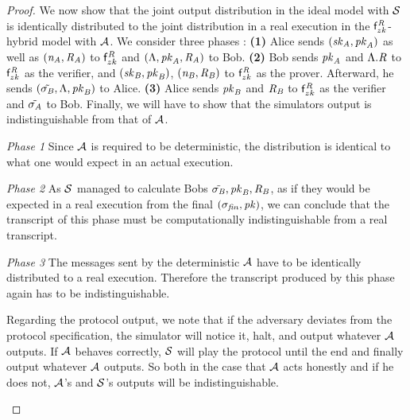\begin{proof}
    We now show that the joint output distribution in the ideal model with $\mathcal{S}$ is identically distributed to the joint distribution in a real execution in the $\mathsf{f}^{\mathit{R}}_{zk}$-hybrid model with $\mathcal{A}$.
    We consider three phases :
    \textbf{(1)} Alice sends $(\mathit{sk}_{\mathit{A}}, \mathit{pk}_{\mathit{A}})$ as well as $(\mathit{\mathit{n}_{\mathit{A}}}, \mathit{R}_{\mathit{A}})$ to $\mathsf{f}^{\mathit{R}}_{zk}$ and $(\Lambda, \mathit{pk}_{\mathit{A}}, \mathit{R}_{\mathit{A}})$ to Bob.
    \textbf{(2)} Bob sends $\mathit{pk}_{\mathit{A}}$ and $\Lambda.\mathit{R}$ to $\mathsf{f}^{\mathit{R}}_{zk}$ as the verifier, and  $(\mathit{sk}_{\mathit{B}}, \mathit{pk}_{\mathit{B}})$, $(\mathit{\mathit{n}_{\mathit{B}}}, \mathit{R}_{\mathit{B}})$ to $\mathsf{f}^{\mathit{R}}_{zk}$ as the prover.
    Afterward, he sends $(\tilde{\sigma_{\mathit{B}}}, \Lambda, \mathit{pk}_{\mathit{B}})$ to Alice.
    \textbf{(3)} Alice sends $\mathit{pk}_{\mathit{B}}$ and $\mathit{R}_{\mathit{B}}$ to $\mathsf{f}^{\mathit{R}}_{zk}$ as the verifier and $\tilde{\sigma_{\mathit{A}}}$ to Bob.
    Finally, we will have to show that the simulators output is indistinguishable from that of $\mathcal{A}$.

    \begin{asparaitem}
        \item \textit{Phase 1} Since $\mathcal{A}$ is required to be deterministic, the distribution is identical to what one would expect in an actual execution.
        \item \textit{Phase 2} As $\mathcal{S}$ managed to calculate Bobs $\tilde{\sigma_{\mathit{B}}}, \mathit{pk}_{\mathit{B}}, \mathit{R}_{\mathit{B}}$, as if they would be expected in a real execution from the final $(\sigma_{\mathit{fin}}, \mathit{pk})$, we can conclude that the transcript of this phase must be computationally indistinguishable from a real transcript.
        \item \textit{Phase 3} The messages sent by the deterministic $\mathcal{A}$  have to be identically distributed to a real execution.
        Therefore the transcript produced by this phase again has to be indistinguishable.
        \item Regarding the protocol output, we note that if the adversary deviates from the protocol specification, the simulator will notice it, halt, and output whatever $\mathcal{A}$ outputs.
        If $\mathcal{A}$ behaves correctly, $\mathcal{S}$ will play the protocol until the end and finally output whatever $\mathcal{A}$ outputs.
        So both in the case that $\mathcal{A}$ acts honestly and if he does not, $\mathcal{A}$'s and $\mathcal{S}$'s outputs will be indistinguishable.
    \end{asparaitem}


\end{proof}

